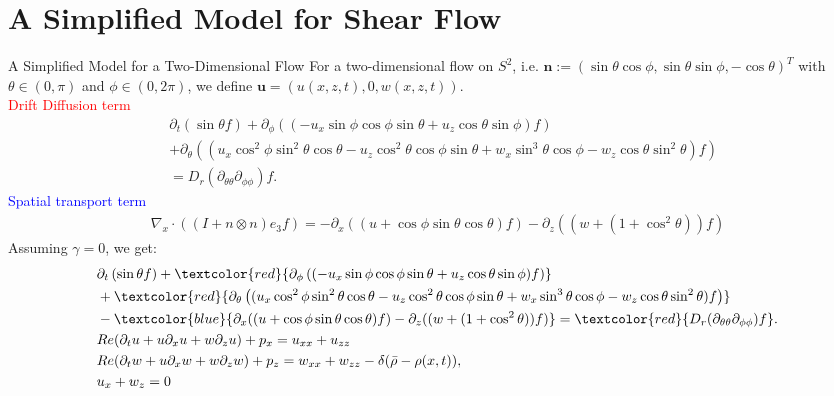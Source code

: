\section{A Simplified Model for Shear Flow}
\begin{frame}{A Simplified Model for a Two-Dimensional Flow}
	\scriptsize
	For a two-dimensional flow on $S^2$, i.e. $\boldsymbol{n} :=(\sin \theta \cos \phi, \sin \theta \sin \phi, -\cos \theta)^T$ with $\theta \in (0,\pi)$ and $\phi \in (0, 2\pi)$, we define
	$\boldsymbol{u} = \left( u(x,z, t), 0, w(x,z, t)\right)$.\\
	\vspace{0.4cm}
\textcolor{red}{Drift Diffusion term} 
   \begin{align*}
	&\partial_{t}\left(\sin \theta f\right)+ \partial_\phi \left((-u_x \sin \phi \cos \phi \sin \theta + u_z \cos \theta \sin \phi)f\right) 
	\\ &+\partial_\theta\left(( u_x \cos^2 \phi \sin^2 \theta \cos \theta - u_z\cos^2 \theta \cos \phi \sin \theta + w_x\sin^3 \theta \cos \phi - w_z\cos \theta \sin^2 \theta) f\right)\\ &=D_{r}(\partial_{\theta\theta}\partial_{\phi\phi})f. 
   \end{align*}
\textcolor{blue}{Spatial transport term}
\begin{align*}
	\nabla_x \cdot ((I+n \otimes n)e_3f) =  -\partial_x((u+\cos\phi \sin\theta \cos\theta)f) - \partial_z((w+(1+\cos^2\theta))f)
\end{align*}
Assuming $\gamma = 0$, we get:
\begin{align*}
	&\partial_{t}\left(\sin \theta f\right)+ \textcolor{red}{\partial_\phi \left((-u_x \sin \phi \cos \phi \sin \theta + u_z \cos \theta \sin \phi)f\right)} 
	\\ &+ \textcolor{red}{\partial_\theta\left(( u_x \cos^2 \phi \sin^2 \theta \cos \theta - u_z\cos^2 \theta \cos \phi \sin \theta + w_x\sin^3 \theta \cos \phi - w_z\cos \theta \sin^2 \theta) f\right)}\\
	 &-\textcolor{blue}{\partial_x((u+\cos\phi \sin\theta \cos\theta)f) - \partial_z((w+(1+\cos^2\theta))f)}
	 = \textcolor{red}{D_{r}(\partial_{\theta\theta}\partial_{\phi\phi})f}. \\
	 &Re (\partial_{t}u + u \partial_x u + w\partial_z u) + p_x = u_{xx} + u_{zz}  \\
	 &Re (\partial_{t}w + u \partial_x w + w\partial_z w) + p_z = w_{xx} + w_{zz} - \delta(\bar{\rho}-\rho(x,t)),\\
	 &u_x + w_z =0
\end{align*}
\end{frame}


